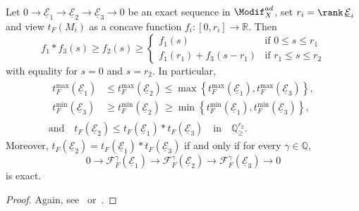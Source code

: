 \begin{prop}\label{prop:OnAdmModif_FarguesExactness}
Let $0\rightarrow\underline{\mathcal{E}}_{1}\rightarrow\underline{\mathcal{E}}_{2}\rightarrow\underline{\mathcal{E}}_{3}\rightarrow0$ be an exact sequence in $\Modif_{X}^{ad}$, set $r_{i}=\rank\,\underline{\mathcal{E}}_{i}$ and view $t_{F}(M_{i})$ as a concave function $f_{i}:[0,r_{i}]\rightarrow\mathbb{R}$. Then
\[
f_{1}\ast f_{3}(s)\geq f_{2}(s)\geq
\begin{cases}
f_{1}(s) & \text{if }0\leq s\leq r_{1}\\
f_{1}(r_{1})+f_{3}(s-r_{1}) & \text{if }r_{1}\leq s\leq r_{2}
\end{cases}
\]
with equality for $s=0$ and $s=r_{2}$. In particular,
\begin{gather*}
\begin{aligned}
t_{F}^{\max}(\underline{\mathcal{E}}_{1}) & \leq t_{F}^{\max}(\underline{\mathcal{E}}_{2}) \leq \max\left\{ t_{F}^{\max}(\underline{\mathcal{E}}_{1}),t_{F}^{\max}(\underline{\mathcal{E}}_{3})\right\},\\
t_{F}^{\min}(\underline{\mathcal{E}}_{3}) & \geq t_{F}^{\min}(\underline{\mathcal{E}}_{2}) \, \geq \min\left\{ t_{F}^{\min}(\underline{\mathcal{E}}_{1}),t_{F}^{\min}(\underline{\mathcal{E}}_{3})\right\},
\end{aligned}
\\
\text{and}\quad t_{F}(\underline{\mathcal{E}}_{2})\leq t_{F}(\underline{\mathcal{E}}_{1})\ast t_{F}(\underline{\mathcal{E}}_{3})\quad\text{in}\quad\mathbb{Q}_{\geq}^{r_{2}}.
\end{gather*}
Moreover, $t_{F}(\underline{\mathcal{E}}_{2})=t_{F}(\underline{\mathcal{E}}_{1})\ast t_{F}(\underline{\mathcal{E}}_{3})$ if and only if for every $\gamma\in\mathbb{Q}$,
\[
0\rightarrow\mathcal{F}_{F}^{\gamma}(\underline{\mathcal{E}}_{1})\rightarrow\mathcal{F}_{F}^{\gamma}(\underline{\mathcal{E}}_{2})\rightarrow\mathcal{F}_{F}^{\gamma}(\underline{\mathcal{E}}_{3})\rightarrow0
\]
is exact.
\end{prop}

\begin{proof}
Again, see~\cite[Proposition~21]{Co16} or~\cite[4.4.4]{An09}.
\end{proof}

